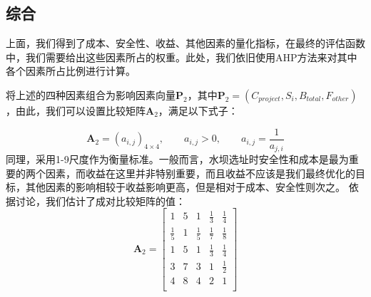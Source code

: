 \documentclass[nocover]{cumcmart}
\begin{document}
\subsection{综合}
上面，我们得到了成本、安全性、收益、其他因素的量化指标，在最终的评估函数中，我们需要给出这些因素所占的权重。此处，我们依旧使用AHP方法来对其中各个因素所占比例进行计算。

将上述的四种因素组合为影响因素向量$\textbf{P}_2$，其中$\textbf{P}_2 = (C_{project}, S_{i}, B_{total}, F_{other})$，由此，我们可以设置比较矩阵$\textbf{A}_2$，满足以下式子：

\[\textbf{A}_2 = (a_{i,j})_{4\times4}, \qquad a_{i,j}>0, \qquad a_{i,j} = \frac{1}{a_{j,i}}\]
同理，采用1-9尺度作为衡量标准。一般而言，水坝选址时安全性和成本是最为重要的两个因素，而收益在这里并非特别重要，而且收益不应该是我们最终优化的目标，其他因素的影响相较于收益影响更高，但是相对于成本、安全性则次之。
依据讨论，我们估计了成对比较矩阵的值：
\[\textbf{A}_2 = 
\left[
\begin{matrix}
1 & 5 & 1 & \frac{1}{3} & \frac{1}{4} \\
\frac{1}{5}  & 1 & \frac{1}{5} & \frac{1}{7} & \frac{1}{8} \\ 
1 & 5 & 1 & \frac{1}{3} & \frac{1}{4} \\
3 & 7 & 3 & 1 & \frac{1}{2} \\
4 & 8 & 4 & 2 & 1 \\
\end{matrix}
\right]
\]
\end{document}
